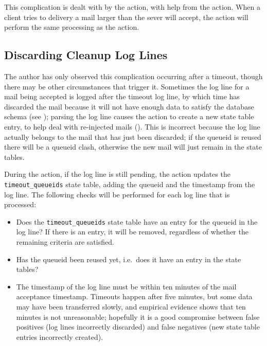 This complication is dealt with by the  action, with help
from the  action.  When a client tries to delivery a mail
larger than the sever will accept, the  action
will perform the same processing as the  action.

\subsection{Discarding Cleanup Log Lines}

\label{discarding cleanup log lines}

The author has only observed this complication occurring after a timeout,
though there may be other circumstances that trigger it.  Sometimes the
 log line for a mail being accepted is logged after the
timeout log line, by which time \parsername{} has discarded the mail
because it will not have enough data to satisfy the database schema (see
); parsing the  log
line causes the  action to create a new state
table entry, to help deal with re-injected mails ().  This is incorrect because the log line actually belongs to the
mail that has just been discarded; if the queueid is reused there will be a
queueid clash, otherwise the new mail will just remain in the state tables.

During the  action, if the  log line is
still pending, the action updates the \texttt{timeout\_queueids} state
table, adding the queueid and the timestamp from the log line.  The
following checks will be performed for each  log line
that is processed:

\begin{itemize}

    \item Does the \texttt{timeout\_queueids} state table have an entry for
        the queueid in the log line?  If there is an entry, it will be
        removed, regardless of whether the remaining criteria are
        satisfied.

    \item Has the queueid been reused yet, i.e.\ does it have an entry in
        the state tables?

    \item The timestamp of the  log line must be within ten
        minutes of the mail acceptance timestamp.  Timeouts happen after
        five minutes, but some data may have been transferred slowly, and
        empirical evidence shows that ten minutes is not unreasonable;
        hopefully it is a good compromise between false positives (log
        lines incorrectly discarded) and false negatives (new state table
        entries incorrectly created).

\end{itemize}


